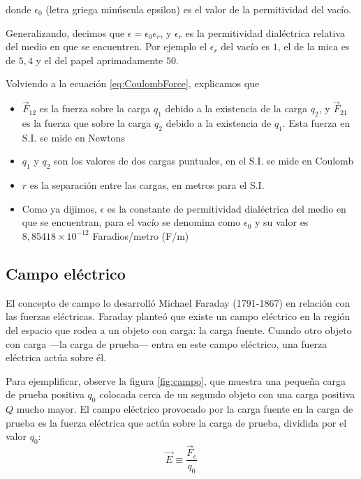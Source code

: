 \documentclass{article}
\begin{document}
donde $\epsilon_0$ (letra griega minúscula epsilon) es el valor de la permitividad del vacío.

Generalizando, decimos que $\epsilon = \epsilon_0\epsilon_r$, y $\epsilon_r$ es la permitividad dialéctrica relativa del medio en que se encuentren. Por ejemplo el $\epsilon_r$ del vacío es $1$, el de la mica es de $5,4$ y el del papel aprimadamente $50$. 

Volviendo a la ecuación \ref{eq:CoulombForce}, explicamos que 

\begin{itemize}
\item $\vec{F}_{12}$ es la fuerza sobre la carga $q_1$ debido a la existencia de la carga $q_2$, y $\vec{F}_{21}$ es la fuerza que  sobre la carga $q_2$ debido a la existencia de $q_1$. Esta fuerza en S.I. se mide en Newtons
\item $q_1$ y $q_2$ son los valores de dos cargas puntuales, en el S.I. se mide en Coulomb
\item $r$ es la separación entre las cargas, en metros para el S.I.
\item Como ya dijimos, $\epsilon$ es la constante de permitividad dialéctrica del medio en que se encuentran, para el vacío se denomina como $\epsilon_0$ y su valor es $8,85418 \times 10^{-12}$ Faradios/metro (F/m)
\end{itemize}

	\subsection{Campo eléctrico}
El concepto de campo lo desarrolló Michael Faraday (1791-1867) en relación con las fuerzas eléctricas. Faraday planteó que existe un campo eléctrico en la región del espacio que rodea a un objeto con carga: la carga fuente. Cuando otro objeto con carga —la carga de prueba— entra en este campo eléctrico, una fuerza eléctrica actúa sobre él. 

Para ejemplificar, observe la figura \ref{fig:campo}, que muestra una pequeña carga de prueba positiva $q_0$ colocada cerca de un segundo objeto con una carga positiva $Q$ mucho mayor. El campo eléctrico provocado por la carga fuente en la carga de prueba es la fuerza eléctrica que actúa sobre la carga de prueba, dividida por el valor $q_0$:
$$
\vec{E}\equiv \frac{\vec{F}_e}{q_0}
$$
\end{document}
